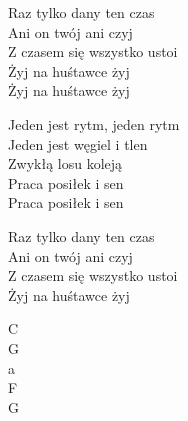 \begin{text}
    Raz tylko dany ten czas\\
    Ani on twój ani czyj\\
    Z czasem się wszystko ustoi\\
    Żyj na huśtawce żyj\\
    Żyj na huśtawce żyj

    Jeden jest rytm, jeden rytm\\
    Jeden jest węgiel i tlen\\
    Zwykłą losu koleją\\
    Praca posiłek i sen\\
    Praca posiłek i sen    

    Raz tylko dany ten czas\\
    Ani on twój ani czyj\\
    Z czasem się wszystko ustoi\\
    Żyj na huśtawce żyj
\end{text}
\begin{chord}
    C\\
    G\\
    a\\
    F\\
    G
\end{chord}